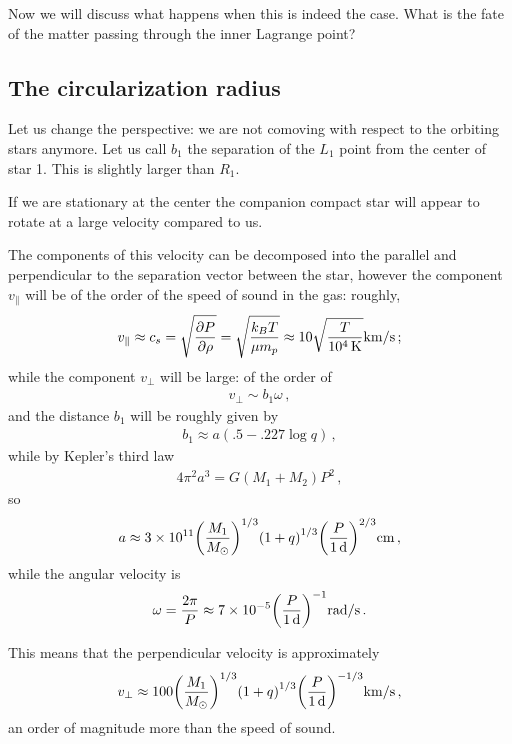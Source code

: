 \documentclass[main.tex]{subfiles}
\begin{document}
Now we will discuss what happens when this is indeed the case. What is the fate of the matter passing through the inner Lagrange point? 

\subsection{The circularization radius}

Let us change the perspective: we are not comoving with respect to the orbiting stars anymore. 
Let us call \(b_1 \) the separation of the \(L_1 \) point from the center of star 1. This is slightly larger than \(R_1 \). 

If we are stationary at the center the companion compact star will appear to rotate at a large velocity compared to us. 

The components of this velocity can be decomposed into the parallel and perpendicular to the separation vector between the star, however the component \(v _ \parallel\) will be of the order of the speed of sound in the gas: roughly, 
%
\begin{align}
v_{\parallel} \approx c_s = \sqrt{ \pdv{P}{\rho }} = \sqrt{\frac{k_B T}{\mu m_p}} \approx \num{10} \sqrt{ \frac{T}{\SI{e4}{K}}} \SI{}{km /s}
\,;
\end{align}
%
while the component \(v_\perp\) will be large: of the order of 
%
\begin{align}
v_\perp \sim b_1 \omega 
\,,
\end{align}
%
and the distance \(b_1\) will be roughly given by \cite[]{plavecTablesRocheModel1964}
%
\begin{align}
b_1 \approx a (\num{.5} - \num{.227} \log q)
\,,
\end{align}
%
while by Kepler's third law 
%
\begin{align}
4 \pi^2 a^3 = G (M_1 + M_2 ) P^2
\,,
\end{align}
%
so 
%
\begin{align}
a \approx \num{3e11} \qty(\frac{M_1 }{M_{\odot}})^{1/3}
\qty(1 + q)^{1/3}
\qty(\frac{P}{\SI{1}{d}})^{2/3} 
\SI{}{cm}
\,,
\end{align}
%
while the angular velocity is 
%
\begin{align}
\omega = \frac{2 \pi }{P} \approx \num{7e-5} \qty(\frac{P}{\SI{1}{d}})^{-1} \SI{}{rad/s}
\,.
\end{align}

This means that the perpendicular velocity is approximately 
%
\begin{align}
v_{\perp} \approx \num{100} \qty(\frac{M_1 }{M_{\odot}})^{1/3}
\qty(1 + q)^{1/3}
\qty(\frac{P}{\SI{1}{d}})^{-1/3}
\SI{}{km/s}
\,,
\end{align}
%
an order of magnitude more than the speed of sound. 
\end{document}
